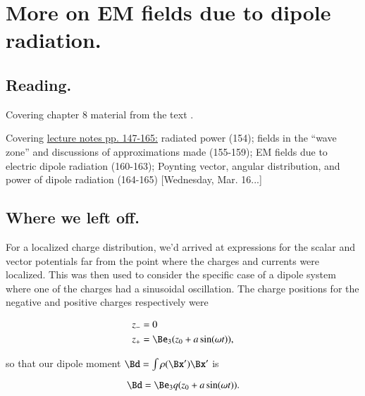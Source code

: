 %
%

\chapter{More on EM fields due to dipole radiation.}
\label{chap:relativisticElectrodynamicsL21}
{}
\date{Mar 22, 2011}

\beginArtNoToc

\section{Reading.}

Covering chapter 8 material from the text \citep{landau1980classical}.

Covering \href{http://www.physics.utoronto.ca/~poppitz/epoppitz/PHY450_files/RelEMpp147-165.pdf}{lecture notes pp. 147-165:} radiated power (154); fields in the ``wave zone'' and discussions of approximations made (155-159); EM fields due to electric dipole radiation (160-163); Poynting vector, angular distribution, and power of dipole radiation (164-165) [Wednesday, Mar. 16...]

\section{Where we left off.}

For a localized charge distribution, we'd arrived at expressions for the scalar and vector potentials far from the point where the charges and currents were localized.  This was then used to consider the specific case of a dipole system where one of the charges had a sinusoidal oscillation.  The charge positions for the negative and positive charges respectively were

\begin{align}\label{eqn:relativisticElectrodynamicsL21:10}
z_{-} &= 0 \\
z_{+} &= \Be_3( z_0 + a \sin(\omega t)) ,
\end{align}

so that our dipole moment $\Bd = \int \rho(\Bx') \Bx'$ is

\begin{equation}\label{eqn:relativisticElectrodynamicsL21:30}
\Bd = \Be_3 q (z_0 + a \sin(\omega t)).
\end{equation}

